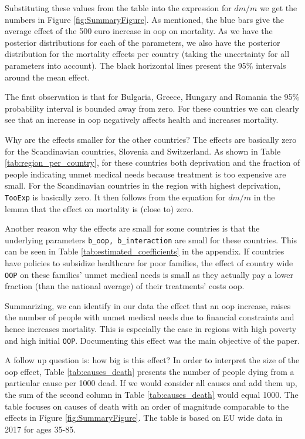 \documentclass[a4paper,12pt]{article}
\begin{document}
Substituting these values from the table into the expression for \(dm/m\) we get the numbers in Figure \ref{fig:SummaryFigure}. As mentioned, the blue bars give the average effect of the 500 euro increase in oop on mortality. As we have the posterior distributions for each of the parameters, we also have the posterior distribution for the mortality effects per country (taking the uncertainty for all parameters into account). The black horizontal lines present the 95\% intervals around the mean effect. 

The first observation is that for Bulgaria, Greece, Hungary and Romania the 95\% probability interval is bounded away from zero. For these countries we can clearly see that an increase in oop negatively affects health and increases mortality. 

Why are the effects smaller for the other countries? The effects are basically zero for the Scandinavian countries, Slovenia and Switzerland. As shown in Table \ref{tab:region_per_country}, for these countries both deprivation and the fraction of people indicating unmet medical needs because treatment is too expensive are small. For the Scandinavian countries in the region with highest deprivation, \texttt{TooExp} is basically zero. It then follows from the equation for \(dm/m\) in the lemma that the effect on mortality is (close to) zero.

Another reason why the effects are small for some countries is that the underlying parameters \texttt{b\_oop, b\_interaction} are small for these countries. This can be seen in Table \ref{tab:estimated_coefficients} in the appendix. If countries have policies to subsidize healthcare for poor families, the effect of country wide \texttt{OOP} on these families' unmet medical needs is small as they actually pay a lower fraction (than the national average) of their treatments' costs oop. 

Summarizing, we can identify in our data the effect that an oop increase, raises the number of people with unmet medical needs due to financial constraints and hence increases mortality. This is especially the case in regions with high poverty and high initial \texttt{OOP}. Documenting this effect was the main objective of the paper.

A follow up question is: how big is this effect? In order to interpret the size of the oop effect, Table \ref{tab:causes_death} presents the number of people dying from a particular cause per 1000 dead. If we would consider all causes and add them up, the sum of the second column in Table \ref{tab:causes_death} would equal 1000. The table focuses on causes of death with an order of magnitude comparable to the effects in Figure \ref{fig:SummaryFigure}. The table is based on EU wide data in 2017 for ages 35-85. 
\end{document}
